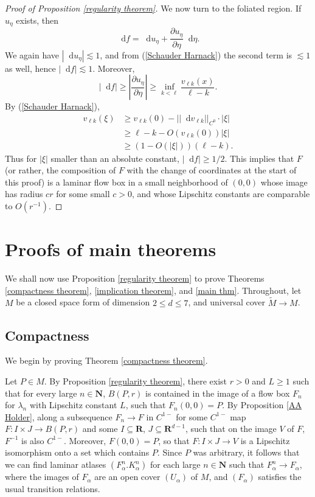 \documentclass[reqno,11pt]{amsart}
\newcommand{\NN}{\mathbf{N}}
\newcommand{\RR}{\mathbf{R}}
\newcommand*\dif{\mathop{}\!\mathrm{d}}
\theoremstyle{definition}
\numberwithin{equation}{section}
\begin{document}
\begin{proof}[Proof of Proposition \ref{regularity theorem}]
We now turn to the foliated region. If $u_\eta$ exists, then
$$\dif f = \dif u_\eta + \frac{\partial u_\eta}{\partial \eta} \dif \eta.$$
We again have $|\dif u_\eta| \lesssim 1$, and from (\ref{Schauder Harnack}) the second term is $\lesssim 1$ as well, hence $|\dif f| \lesssim 1$.
Moreover,
$$|\dif f| \geq \left|\frac{\partial u_\eta}{\partial \eta}\right| \geq \inf_{k < \ell} \frac{v_{\ell k}(x)}{\ell - k}.$$
By (\ref{Schauder Harnack}),
\begin{align*}
	v_{\ell k}(\xi) &\geq v_{\ell k}(0) - ||\dif v_{\ell k}||_{C^0} \cdot |\xi| \\
	&\geq \ell - k - O(v_{\ell k}(0)) |\xi| \\
	&\geq (1 - O(|\xi|)) (\ell - k).
\end{align*}
Thus for $|\xi|$ smaller than an absolute constant, $|\dif f| \geq 1/2$.
This implies that $F$ (or rather, the composition of $F$ with the change of coordinates at the start of this proof) is a laminar flow box in a small neighborhood of $(0, 0)$ whose image has radius $cr$ for some small $c > 0$, and whose Lipschitz constants are comparable to $O(r^{-1})$.
\end{proof}

\section{Proofs of main theorems}\label{CompactnessSec}
We shall now use Proposition \ref{regularity theorem} to prove Theorems \ref{compactness theorem}, \ref{implication theorem}, and \ref{main thm}.
Throughout, let $M$ be a closed space form of dimension $2 \leq d \leq 7$, and universal cover $\tilde M \to M$.

\subsection{Compactness}
We begin by proving Theorem \ref{compactness theorem}.

Let $P \in M$.
By Proposition \ref{regularity theorem}, there exist $r > 0$ and $L \geq 1$ such that for every large $n \in \NN$, $B(P, r)$ is contained in the image of a flow box $F_n$ for $\lambda_n$ with Lipschitz constant $L$, such that $F_n(0, 0) = P$.
By Proposition \ref{AA Holder}, along a subsequence $F_n \to F$ in $C^{1-}$ for some $C^{1-}$ map $F: I \times J \to B(P, r)$ and some $I \subseteq \RR$, $J \subseteq \RR^{d - 1}$, such that on the image $V$ of $F$, $F^{-1}$ is also $C^{1-}$.
Moreover, $F(0, 0) = P$, so that $F: I \times J \to V$ is a Lipschitz isomorphism onto a set which contains $P$.
Since $P$ was arbitrary, it follows that we can find laminar atlases $(F_\alpha^n. K_\alpha^n)$ for each large $n \in \NN$ such that $F_\alpha^n \to F_\alpha$, where the images of $F_\alpha$ are an open cover $(U_\alpha)$ of $M$, and $(F_\alpha)$ satisfies the usual transition relations.
\end{document}
